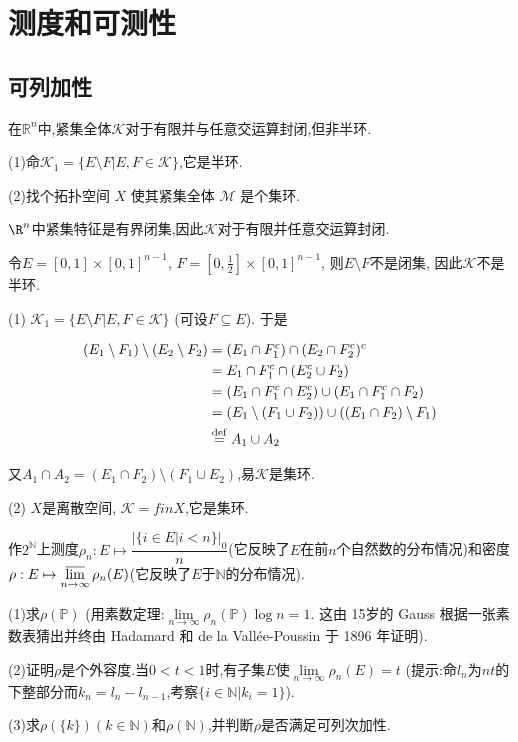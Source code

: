     
\section{测度和可测性}

\subsection{可列加性}
\begin{3}
在$\mathbb{R}^n$中,紧集全体$\mathcal{K}$对于有限并与任意交运算封闭,但非半环.

(1)命$\mathcal{K}_1=\{E\setminus F|E,F\in\mathcal{K}\}$,它是半环.

(2)找个拓扑空间 $X$ 使其紧集全体 $\mathcal{M}$ 是个集环.
 \end{3}  
\begin{solution}
$\R^{n}$中紧集特征是有界闭集,因此$\mathcal{K}$对于有限并任意交运算封闭.

令$E=[0,1]\times[0,1]^{n-1}$, $F=[0,\frac{1}{2}]\times[0,1]^{n-1}$,
则$E\setminus F$不是闭集, 因此$\mathcal{K}$不是半环.

(1) $\mathcal{K}_1=\{E\setminus F|E,F\in \mathcal{K}\}$ (可设$F\subseteq E$). 于是

\begin{align*}
(E_1\setminus F_{1})\setminus(E_{2}\setminus F_{2})
&=(E_{1}\cap F_{1}^{c})\cap(E_{2}\cap F_{2}^{c})^{c}\\
&=E_{1}\cap F_{1}^{c}\cap(E_{2}^{c}\cup F_{2})\\
&=(E_{1}\cap F_{1}^c\cap E_{2}^{c})\cup\left(E_{1}\cap F_{1}^{c}\cap F_{2}\right)\\
&=\left(E_{1}\setminus (F_{1}\cup F_{2})\right)\cup\left((E_{1}\cap F_{2})\setminus F_{1}\right)\\
&\overset{\rm def}{=}A_1\cup A_2
\end{align*}

又$A_1\cap A_2=(E_1\cap F_2)\setminus(F_1\cup E_2)$,易$\mathcal{K}$是集环.

(2) $X$是离散空间, $\mathcal{K}=finX$,它是集环.
\end{solution}
\begin{5}
作$2^{\mathbb{N}}$上测度$\rho_n:E\mapsto\dfrac{|\{i\in E |i<n\}|_0}{n}$(它反映了$E$在前$n$个自然数的分布情况)和密度$\rho:E\mapsto\varlimsup\limits_{n\to\infty}\rho_n(E)$(它反映了$E$于$\mathbb{N}$的分布情况).

(1)求$\rho(\mathbb{P})$ (用素数定理:$\lim\limits_{n\to\infty}\rho_n(\mathbb{P})\log n=1$. 这由 15岁的 Gauss 根据一张素数表猜出并终由 Hadamard 和 de la Vallée-Poussin 于 1896 年证明).

(2)证明$\rho$是个外容度.当$0<t<1$时,有子集$E$使$\lim\limits_{n\to\infty}\rho_n(E)=t$ (提示:命$l_n$为$nt$的下整部分而$k_n=l_n-l_{n-1}$,考察$\{i\in\mathbb{N}|k_i=1\}$).

(3)求$\rho(\{k\})(k\in\mathbb{N})$和$\rho(\mathbb{N})$,并判断$\rho$是否满足可列次加性. 
  \end{5} 
